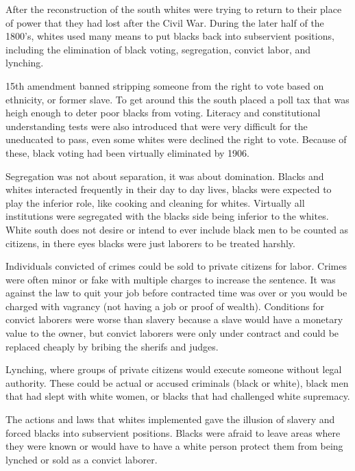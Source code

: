 After the reconstruction of the south whites were trying to return to their place of power that they had lost after the Civil War.
During the later half of the 1800's, whites used many means to put blacks back into subservient positions, including the elimination of black voting, segregation, convict labor, and lynching.

15th amendment banned stripping someone from the right to vote based on ethnicity, or former slave. 
To get around this the south placed a poll tax that was heigh enough to deter poor blacks from voting.
Literacy and constitutional understanding tests were also introduced that were very difficult for the uneducated to pass, even some whites were declined the right to vote.
Because of these, black voting had been virtually eliminated by 1906.

Segregation was not about separation, it was about domination. 
Blacks and whites interacted frequently in their day to day lives, blacks were expected to play the inferior role, like cooking and cleaning for whites. 
Virtually all institutions were segregated with the blacks side being inferior to the whites.
White south does not desire or intend to ever include black men to be counted as citizens, in there eyes blacks were just laborers to be treated harshly.

Individuals convicted of crimes could be sold to private citizens for labor.
Crimes were often minor or fake with multiple charges to increase the sentence.
It was against the law to quit your job before contracted time was over or you would be charged with vagrancy (not having a job or proof of wealth).
Conditions for convict laborers were worse than slavery because a slave would have a monetary value to the owner, but convict laborers were only under contract and could be replaced cheaply by bribing the sherifs and judges.

Lynching, where groups of private citizens would execute someone without legal authority.
These could be actual or accused criminals (black or white), black men that had slept with white women, or blacks that had challenged white supremacy.

The actions and laws that whites implemented gave the illusion of slavery and forced blacks into subservient positions.
Blacks were afraid to leave areas where they were known or would have to have a white person protect them from being lynched or sold as a convict laborer.